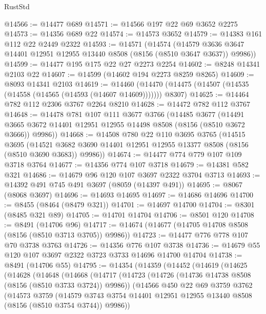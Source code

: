 \begin{lexlean}{RustStd}
\begin{coremodule}
{\begin{coremodule}
{{{{{{{{{{{{{{{{{{{{{{{{{{{{{{{{{{@14566 := @14477 @689
@14571 := @14566 @197 @22 @69 @3652 @2275
@14573 := @14356 @689 @22
@14574 := @14573 @3652
@14579 := @14383 @161 @112 @22 @2449 @2322
@14593 := @14571
    (@14574
      (@14579 @3636 @3647 @14401 @12951 @12955 @13440 @8508 (@8156 (@8510 @3647 @3637)) @9986))
@14599 := @14477 @195 @175 @22 @27 @2273 @2254
@14602 := @8248 @14341 @2103 @22
@14607 := @14599 (@14602 @194 @2273 @8259 @8265)
@14609 := @8093 @14341 @2103
@14619 := @14460
    (@14470 (@14475 (@14507 (@14535 (@14558 (@14565 (@14593 (@14607 @14609))))))) @8307)
@14625 := @14464 @782 @112 @2306 @3767 @2264 @8210
@14628 := @14472 @782 @112 @3767
@14648 := @14478
    @781
    @107
    @111
    @3677
    @3766
    (@14485
      @3677
      (@14491 @3665 @3672 @14401 @12951 @12955 @14498 @8508 (@8156 (@8510 @3672 @3666)) @9986))
@14668 := @14508
    @780
    @22
    @110
    @3695
    @3765
    (@14515
      @3695
      (@14521 @3682 @3690 @14401 @12951 @12955 @13377 @8508 (@8156 (@8510 @3690 @3683)) @9986))
@14674 := @14477 @774 @779 @107 @109 @3718 @3764
@14677 := @14356 @774 @107 @3718
@14679 := @14381 @582 @321
@14686 := @14679 @96 @120 @107 @3697 @2322 @3704 @3713
@14693 := @14392 @491 @745 @491 @3697 (@8059 (@14397 @491))
@14695 := @8067 (@8068 @3697)
@14696 := @14693 @14695
@14697 := @14686 @14696
@14700 := @8455 (@8464 (@8479 @321))
@14701 := @14697 @14700
@14704 := @8301 (@8485 @321 @89)
@14705 := @14701 @14704
@14706 := @8501 @120
@14708 := @8491 (@14706 @96)
@14717 := @14674 (@14677 (@14705 @14708 @8508 (@8156 (@8510 @3713 @3705)) @9986))
@14723 := @14477 @776 @778 @107 @70 @3738 @3763
@14726 := @14356 @776 @107 @3738
@14736 := @14679 @55 @120 @107 @3697 @2322 @3723 @3733 @14696 @14700 @14704
@14738 := @8491 (@14706 @55)
@14795 := @14354
    (@14359
      (@14452
        (@14619
          (@14625
            (@14628
              (@14648
                (@14668
                  (@14717
                    (@14723
                      (@14726 (@14736 @14738 @8508 (@8156 (@8510 @3733 @3724)) @9986))
                      (@14566
                        @450
                        @22
                        @69
                        @3759
                        @3762
                        (@14573
                          @3759
                          (@14579
                            @3743
                            @3754
                            @14401
                            @12951
                            @12955
                            @13440
                            @8508
                            (@8156 (@8510 @3754 @3744))
                            @9986))
}}}}}}}}}}}}}}}}}}}}}}}}}}}}}}}}}}
\end{coremodule}}
\end{coremodule}
\end{lexlean}
